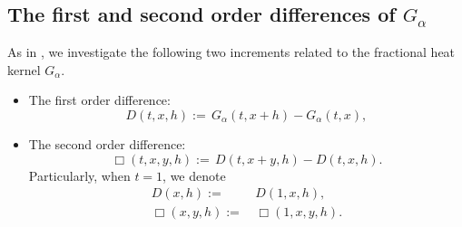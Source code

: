 \documentclass[11pt,reqno]{amsart}
\numberwithin{equation}{section}
\newcommand{\1}{{\bf 1}}
\newcommand{\2}{{\bf 2}}
\begin{document}
  
  \subsection{The first and second order differences of $G_{\alpha}$}
     
 As in \cite{HW2022}, we investigate the following two increments related to the fractional  heat kernel $G_{\alpha}$.
\begin{itemize}
\item[(i)] The first order difference:
 \begin{equation}\label{nota alpha  1} 
 D(t,x,h):= \, G_{\alpha}(t,x+h)-G_{\alpha}(t,x),  
  \end{equation}
\item[(ii)] The second order difference:
 \begin{equation}\label{nota alpha 2}
\Box(t,x,y,h) :=  \, D(t,x+y,h)-D(t,x,h).
\end{equation}
Particularly, when $t=1$, we denote
   \begin{equation}\label{nota alpha  time 1}
 \begin{split}
    D(x,h):= &\, D(1,x,h), \\
   \Box(x,y,h):=&\, \Box(1,x,y,h).
  \end{split}\end{equation}
   \end{itemize}
  
\end{document}
